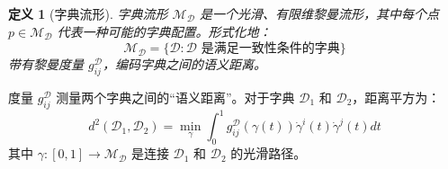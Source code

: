 \documentclass[11pt,a4paper]{article}
\newtheorem{definition}{定义}
\begin{document}
	\begin{definition}[字典流形]
		字典流形 $\mathcal{M}_{\mathcal{D}}$ 是一个光滑、有限维黎曼流形，其中每个点 $p \in \mathcal{M}_{\mathcal{D}}$ 代表一种可能的字典配置。形式化地：
		\begin{equation}
			\mathcal{M}_{\mathcal{D}} = \{ \mathcal{D} : \mathcal{D} \text{ 是满足一致性条件的字典} \}
		\end{equation}
		带有黎曼度量 $g_{ij}^{\mathcal{D}}$，编码字典之间的语义距离。
	\end{definition}
	
	度量 $g_{ij}^{\mathcal{D}}$ 测量两个字典之间的“语义距离”。对于字典 $\mathcal{D}_1$ 和 $\mathcal{D}_2$，距离平方为：
	\begin{equation}
		d^2(\mathcal{D}_1, \mathcal{D}_2) = \min_{\gamma} \int_0^1 g_{ij}^{\mathcal{D}}(\gamma(t)) \dot{\gamma}^i(t) \dot{\gamma}^j(t) dt
	\end{equation}
	其中 $\gamma: [0,1] \to \mathcal{M}_{\mathcal{D}}$ 是连接 $\mathcal{D}_1$ 和 $\mathcal{D}_2$ 的光滑路径。
	
\end{document}
